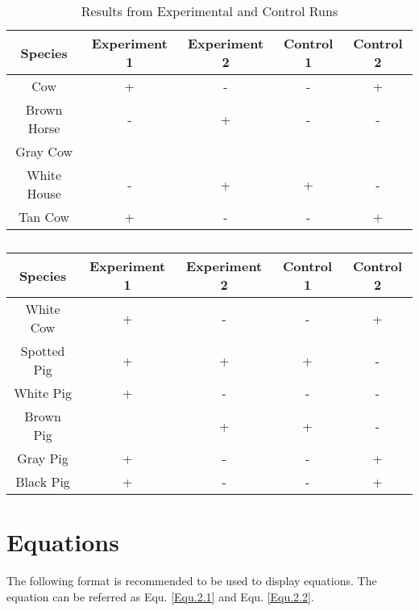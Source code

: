{\begin{table}[!htbp]
\captionsetup{justification=centering}

\caption{Results from Experimental and Control Runs \label{table:control_runs}}

\begin{tabular}{|c|c|c|c|c|}
\hline
Species & Experiment 1 & Experiment 2 & Control 1 & Control 2\\
\hline
Cow & + & - & - & +\\
\hline
Brown Horse & - & + & - & -\\
\hline
Gray Cow &  &  &  & \\
\hline
White House & - & + & + & -\\
\hline
Tan Cow & + & - & - & +\\
\hline

\end{tabular}
\end{table}

 \cleardoublepage

 \begin{table}[!htbp]
 \ContinuedFloat
\captionsetup{list=off, format=cont}

 \label{table:control_runs_continued}
 
 \caption{} 

\begin{tabular}{|c|c|c|c|c|}
\hline
Species & Experiment 1 & Experiment 2 & Control 1 & Control 2\\
\hline
White Cow & + & - & - & +\\
\hline
Spotted Pig & + & + & + & -\\
\hline
White Pig & + & - & - & - \\
\hline
Brown Pig &  & + & + & -\\
\hline
Gray Pig & + & - & - & +\\
\hline
Black Pig & + & - & - & +\\
\hline

\end{tabular}
\end{table}



\section{Equations}

The following format is recommended to be used to display equations. The equation can be referred as Equ. \ref{Equ.2.1} and Equ. \ref{Equ.2.2}. 


}
